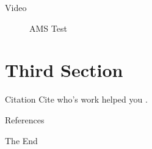 \documentclass{beamer}
\begin{document}
    \begin{frame}{Video}
      \begin{figure}[h!]
        \centering
          \caption{AMS Test}
      \end{figure}
    \end{frame}

  \section{Third Section}

    \begin{frame}{Citation}
      Cite who's work helped you \cite{oldThesis}.
    \end{frame}

    \begin{frame}[allowframebreaks]{References}
      
      
    \end{frame}

    \begin{frame}
      \Huge{\centerline{The End}}
    \end{frame}
\end{document}
